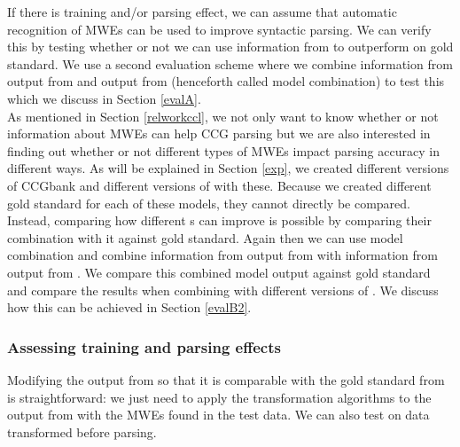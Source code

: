 \documentclass[output=paper]{LSP/langsci}
\begin{document}
    \indent If there is training and/or parsing effect, we can assume that automatic recognition of MWEs can be used to improve syntactic parsing. We can verify this by testing whether or not we can use information from \modelB to outperform \modelA on gold standard. We use a second evaluation scheme where we combine information from output from \modelA and output from \modelB (henceforth called model combination) to test this which we discuss in Section \ref{evalA}. \\
    \indent As mentioned in Section \ref{relworkccl}, we not only want to know whether or not information about MWEs can help CCG parsing but we are also interested in finding out whether or not different types of MWEs impact parsing accuracy in different ways. As will be explained in Section \ref{exp}, we created different versions of CCGbank and different versions of \modelB with these. Because we created different gold standard for each of these models, they cannot directly be compared. Instead, comparing how different \modelB s can improve \modelA is possible by comparing their combination with it against gold standard. Again then we can use model combination and combine information from output from \modelA with information from output from \modelB. We compare this combined model output against gold standard and compare the results when combining \modelA with different versions of \modelB. We discuss how this can be achieved in Section \ref{evalB2}. 
    \subsubsection{Assessing training and parsing effects}
    \label{evalB}
    \indent Modifying the output from \modelA so that it is comparable with the gold standard from \modelB is straightforward: we just need to apply the transformation algorithms to the output from \modelA with the MWEs found in the test data. We can also test \modelA on data transformed before parsing.
\end{document}
